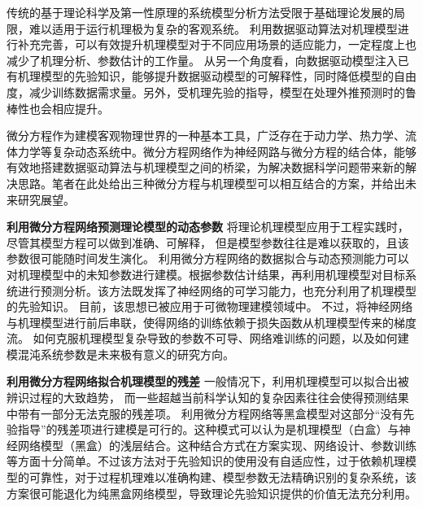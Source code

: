 




传统的基于理论科学及第一性原理的系统模型分析方法受限于基础理论发展的局限，难以适用于运行机理极为复杂的客观系统。
利用数据驱动算法对机理模型进行补充完善，可以有效提升机理模型对于不同应用场景的适应能力，一定程度上也减少了机理分析、参数估计的工作量。
从另一个角度看，向数据驱动模型注入已有机理模型的先验知识，能够提升数据驱动模型的可解释性，同时降低模型的自由度，减少训练数据需求量。另外，受机理先验的指导，模型在处理外推预测时的鲁棒性也会相应提升。

微分方程作为建模客观物理世界的一种基本工具，广泛存在于动力学、热力学、流体力学等复杂动态系统中。微分方程网络作为神经网路与微分方程的结合体，能够有效地搭建数据驱动算法与机理模型之间的桥梁，为解决数据科学问题带来新的解决思路。笔者在此处给出三种微分方程与机理模型可以相互结合的方案，并给出未来研究展望。

\textbf{利用微分方程网络预测理论模型的动态参数}
将理论机理模型应用于工程实践时，尽管其模型方程可以做到准确、可解释，
但是模型参数往往是难以获取的，且该参数很可能随时间发生演化。
利用微分方程网络的数据拟合与动态预测能力可以对机理模型中的未知参数进行建模。根据参数估计结果，再利用机理模型对目标系统进行预测分析。该方法既发挥了神经网络的可学习能力，也充分利用了机理模型的先验知识。
目前，该思想已被应用于可微物理建模领域中\cite{takahashi2021differentiable}。
不过，将神经网络与机理模型进行前后串联，使得网络的训练依赖于损失函数从机理模型传来的梯度流。
如何克服机理模型复杂导致的参数不可导、网络难训练的问题，以及如何建模混沌系统参数是未来极有意义的研究方向。

\textbf{利用微分方程网络拟合机理模型的残差}
一般情况下，利用机理模型可以拟合出被辨识过程的大致趋势，
而一些超越当前科学认知的复杂因素往往会使得预测结果中带有一部分无法克服的残差项。
利用微分方程网络等黑盒模型对这部分“没有先验指导”的残差项进行建模是可行的。这种模式可以认为是机理模型（白盒）与神经网络模型（黑盒）的浅层结合。这种结合方式在方案实现、网络设计、参数训练等方面十分简单。不过该方法对于先验知识的使用没有自适应性，过于依赖机理模型的可靠性，对于过程机理难以准确构建、模型参数无法精确识别的复杂系统，该方案很可能退化为纯黑盒网络模型，导致理论先验知识提供的价值无法充分利用。

